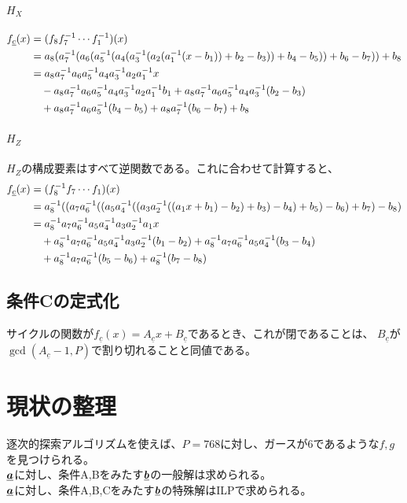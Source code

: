 \documentclass[a4paper,11pt,dvipdfmx]{jsarticle}
\theoremstyle{definition}
\begin{document}
\paragraph{$H_X$}
\begin{align}
  f_{\underline{c}}(x) &= (f_{8}f^{-1}_{7}\cdots f^{-1}_{1})(x)\\
  &=a_8(a_7^{-1}(a_6(a_5^{-1}(a_4(a_3^{-1}(a_2(a_1^{-1}(x-b_1))+b_2-b_3))+b_4-b_5))+b_6-b_7))+b_8\\
  &=a_8a_7^{-1} a_6a_5^{-1} a_4a_3^{-1} a_2a_1^{-1} x\\
  &\quad -a_8a_7^{-1} a_6a_5^{-1} a_4a_3^{-1} a_2a_1^{-1} b_1+a_8a_7^{-1} a_6a_5^{-1} a_4a_3^{-1}(b_2-b_3)\\
  &\quad +a_8a_7^{-1} a_6a_5^{-1}(b_4-b_5)+a_8a_7^{-1}(b_6-b_7)+b_8
\end{align}

\paragraph{$H_Z$}
$H_Z$の構成要素はすべて逆関数である。これに合わせて計算すると、
\begin{align}
  f_{\underline{c}}(x) &= (f_{8}^{-1} f_{7}\cdots f_{1})(x)\\
  &=a_8^{-1}((a_7 a_6^{-1}((a_5 a_4^{-1}((a_3 a_2^{-1}((a_1 x+b_1)-b_2)+b_3)-b_4)+b_5)-b_6)+b_7)-b_8)\\
  &=a_8^{-1} a_7 a_6^{-1} a_5 a_4^{-1} a_3 a_2^{-1} a_1 x\\
  &\quad +a_8^{-1} a_7 a_6^{-1} a_5 a_4^{-1} a_3 a_2^{-1}(b_1-b_2)+a_8^{-1} a_7 a_6^{-1} a_5 a_4^{-1}(b_3-b_4)\\
  &\quad +a_8^{-1} a_7 a_6^{-1}(b_5-b_6)+a_8^{-1}(b_7-b_8)\\
\end{align}

\subsection{条件Cの定式化}
サイクルの関数が$f_{\underline{c}}(x) = A_{\underline{c}}x + B_{\underline{c}}$であるとき、これが閉であることは、
$B_{\underline{c}}$が$\gcd(A_{\underline{c}}-1, P)$で割り切れることと同値である。

\section{現状の整理}
逐次的探索アルゴリズムを使えば、$P=768$に対し、ガースが6であるような$f,g$を見つけられる。\\
$\underline{\bm{a}}$に対し、条件A,Bをみたす$\underline{\bm{b}}$の一般解は求められる。\\
$\underline{\bm{a}}$に対し、条件A,B,Cをみたす$\underline{\bm{b}}$の特殊解はILPで求められる。\\
\end{document}
